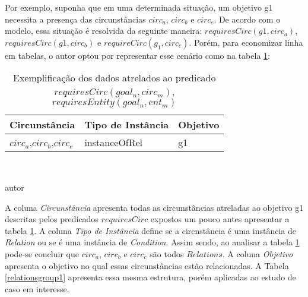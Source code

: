 Por exemplo, suponha que em uma determinada situação, um objetivo g1 necessita a presença das circunstâncias $circ_a$, $circ_b$ e $circ_c$. De acordo com o modelo, essa situação é resolvida da seguinte maneira: $requiresCirc(g1,circ_a)$, $requiresCirc(g1,circ_b)$ e $requireCirc(g_1,circ_c)$. Porém, para economizar linha em tabelas, o autor optou por representar esse cenário como na tabela \ref{tableexemplgroupdataone}:

\begin{table}[H]
\centering
\caption{Exemplificação dos dados atrelados ao predicado $requiresCirc(goal_n, circ_m)$,$requiresEntity(goal_n, ent_m)$}
\begin{tabular}{|l|l|l|}
\hline
\textbf{Circunstância}		 	& \textbf{Tipo de Instância}	&	\textbf{Objetivo}	\\ \hline
$circ_a$,$circ_b$,$circ_c$		& instanceOfRel 				& 	 g1         		\\ \hline
\end{tabular}
\\
\begin{center}
autor
\end{center}
\label{tableexemplgroupdataone}
\end{table}

A coluna \textit{Circunstância} apresenta todas as circunstâncias atreladas ao objetivo g1 descritas pelos predicados $requiresCirc$ expostos um pouco antes apresentar a tabela \ref{tableexemplgroupdataone}. A coluna \textit{Tipo de Instância} define se a circnstância é uma instância de \textit{Relation} ou se é uma instância de \textit{Condition}. Assim sendo, ao analisar a tabela \ref{tableexemplgroupdataone} pode-se concluir que $circ_a$, $circ_b$ e $circ_c$ são todos $Relations$. A coluna \textit{Objetivo} apresenta o objetivo no qual essas circunstâncias estão relacionadas. A Tabela \ref{relationsgroup1} apresenta essa mesma estrutura, porém aplicadas ao estudo de caso em interesse.

